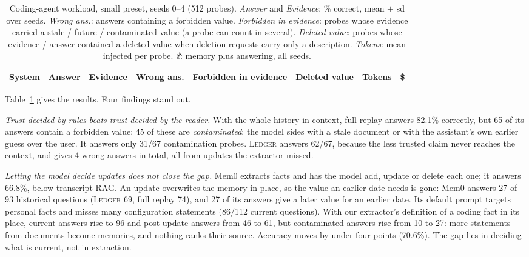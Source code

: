 \documentclass[10pt,conference]{IEEEtran}
\newcommand{\sys}{\textsc{Ledger}}
\begin{document}
\begin{table}[t]
\caption{Coding-agent workload, small preset, seeds 0--4 (512 probes). \emph{Answer}
and \emph{Evidence}: \% correct, mean $\pm$ sd over seeds. \emph{Wrong ans.}:
answers containing a forbidden value. \emph{Forbidden in evidence}: probes whose
evidence carried a stale / future / contaminated value (a probe can count in several). \emph{Deleted value}:
probes whose evidence / answer contained a deleted value when deletion requests
carry only a description. \emph{Tokens}: mean injected per probe. \emph{\$}: memory
plus answering, all seeds.}
\label{tab:coding}
\centering
\footnotesize
\begin{tabular}{@{}lccrcccr@{}}
\toprule
System & Answer & Evidence & Wrong ans. & Forbidden in evidence & Deleted value & Tokens & \$ \\
\midrule

\bottomrule
\end{tabular}
\end{table}

Table~\ref{tab:coding} gives the results. Four findings stand out.

\emph{Trust decided by rules beats trust decided by the reader.} With the whole
history in context, full replay answers 82.1\% correctly, but 65 of its answers
contain a forbidden value; 45 of these are \emph{contaminated}: the model sides
with a stale document or with the assistant's own earlier guess over the user.
It answers only 31/67 contamination probes. \sys{} answers 62/67, because
the less trusted claim never reaches the context, and gives 4 wrong answers in
total, all from updates the extractor missed.

\emph{Letting the model decide updates does not close the gap.} Mem0 extracts
facts and has the model add, update or delete each one; it answers 66.8\%,
below transcript RAG. An update overwrites the memory in place, so the value
an earlier date needs is gone: Mem0 answers 27 of 93 historical questions
(\sys{} 69, full replay 74), and 27 of its answers give a later value for an
earlier date. Its default prompt targets personal facts and misses many
configuration statements (86/112 current questions). With our extractor's
definition of a coding fact in its place, current answers rise to 96 and
post-update answers from 46 to 61, but contaminated answers rise from 10 to
27: more statements from documents become memories, and nothing ranks their
source. Accuracy moves by under four points (70.6\%). The gap lies in deciding
what is current, not in extraction.
\end{document}
